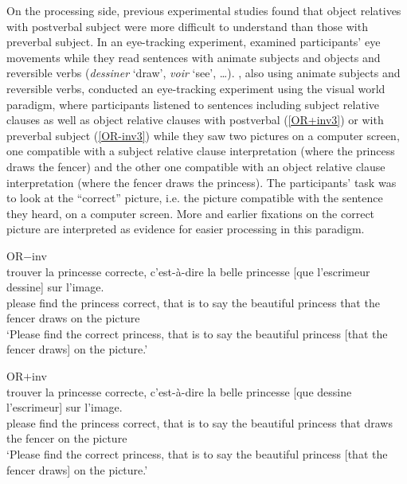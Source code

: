 \documentclass[output=paper]{langscibook}
\begin{document}
On the processing side, previous experimental studies found that
object relatives with postverbal subject were more difficult to
understand than those with preverbal subject. In an eye-tracking experiment,  \citet{Holmes1981}
examined participants' eye movements while they read sentences with animate
subjects and objects and reversible verbs (\textit{dessiner} ‘draw’,
\textit{voir} ‘see’, …).  \citet{pozniak2015processing}, also using
animate subjects and reversible verbs, conducted an eye-tracking
experiment using the visual world paradigm, where participants listened to 
sentences including subject relative clauses as well as
object relative clauses with postverbal (\ref{OR+inv3}) or with
preverbal subject (\ref{OR-inv3}) while they saw two pictures on a
computer screen, one compatible with a subject relative clause
interpretation (where the princess draws the fencer) and the other one
compatible with an object relative clause interpretation (where the
fencer draws the princess). The participants’ task was to look at the
``correct'' picture, i.e. the picture compatible with the sentence they
heard, on a computer screen. More and earlier fixations on the correct
picture are interpreted as evidence for easier processing in this
paradigm.


\begin{exe}
\ex OR$-$inv \label{OR-inv3}\\ 
 trouver la princesse correcte, c'est-à-dire la belle princesse [que l'escrimeur dessine] sur l'image. \\ please find the princess correct, {that is to say} the beautiful princess that {the fencer} draws on {the picture}\\ 
\glt `Please find the correct princess, that is to say the beautiful princess [that the fencer draws] on the picture.'

\ex OR$+$inv \label{OR+inv3}\\ 
 trouver la princesse correcte, c'est-à-dire la belle princesse [que dessine l'escrimeur] sur l'image. \\   please find the princess correct, {that is to say} the beautiful princess that  draws {the fencer} on {the picture}\\ 
\glt `Please find the correct princess, that is to say the beautiful princess [that the fencer draws] on the picture.'
\end{exe}
\end{document}
